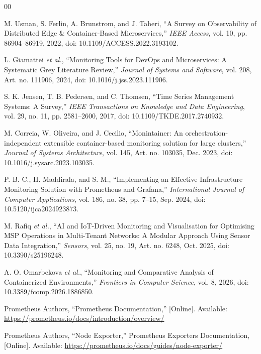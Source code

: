 \documentclass[conference]{IEEEtran}
\begin{document}
\begin{thebibliography}{00}

M. Usman, S. Ferlin, A. Brunstrom, and J. Taheri,
``A Survey on Observability of Distributed Edge \&
Container-Based Microservices,''
\textit{IEEE Access}, vol. 10, pp. 86904--86919, 2022,
doi: 10.1109/ACCESS.2022.3193102.

L. Giamattei \textit{et al.},
``Monitoring Tools for DevOps and Microservices:
A Systematic Grey Literature Review,''
\textit{Journal of Systems and Software}, vol. 208,
Art. no. 111906, 2024,
doi: 10.1016/j.jss.2023.111906.

S. K. Jensen, T. B. Pedersen, and C. Thomsen,
``Time Series Management Systems: A Survey,''
\textit{IEEE Transactions on Knowledge and Data Engineering},
vol. 29, no. 11, pp. 2581--2600, 2017,
doi: 10.1109/TKDE.2017.2740932.

M. Correia, W. Oliveira, and J. Cecilio,
``Monintainer: An orchestration-independent extensible
container-based monitoring solution for large clusters,''
\textit{Journal of Systems Architecture}, vol. 145,
Art. no. 103035, Dec. 2023,
doi: 10.1016/j.sysarc.2023.103035.

P. B. C., H. Maddirala, and S. M.,
``Implementing an Effective Infrastructure Monitoring
Solution with Prometheus and Grafana,''
\textit{International Journal of Computer Applications},
vol. 186, no. 38, pp. 7--15, Sep. 2024,
doi: 10.5120/ijca2024923873.

M. Rafiq \textit{et al.},
``AI and IoT-Driven Monitoring and Visualisation for
Optimising MSP Operations in Multi-Tenant Networks:
A Modular Approach Using Sensor Data Integration,''
\textit{Sensors}, vol. 25, no. 19, Art. no. 6248, Oct. 2025,
doi: 10.3390/s25196248.

A. O. Omarbekova \textit{et al.},
``Monitoring and Comparative Analysis of Containerized
Environments,'' \textit{Frontiers in Computer Science},
vol. 8, 2026, doi: 10.3389/fcomp.2026.1886850.

Prometheus Authors, ``Prometheus Documentation,''
[Online]. Available:
\url{https://prometheus.io/docs/introduction/overview/}

Prometheus Authors, ``Node Exporter,''
Prometheus Exporters Documentation, [Online]. Available:
\url{https://prometheus.io/docs/guides/node-exporter/}


\end{thebibliography}
\end{document}
